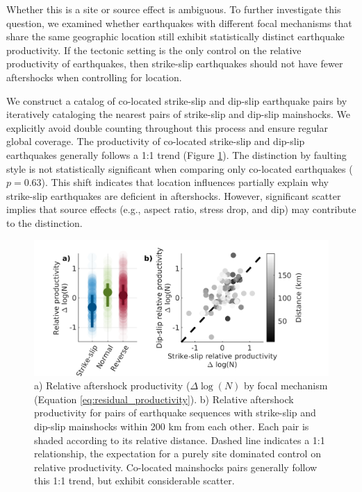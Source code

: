 \documentclass[draft]{agujournal2018}
\begin{document}
    Whether this is a site or source effect is ambiguous. To further investigate this question, we examined whether earthquakes with different focal mechanisms that share the same geographic location still exhibit statistically distinct earthquake productivity. If the tectonic setting is the only control on the relative productivity of earthquakes, then strike-slip earthquakes should not have fewer aftershocks when controlling for location. 
    
    We construct a catalog of co-located strike-slip and dip-slip earthquake pairs by iteratively cataloging the nearest pairs of strike-slip and dip-slip mainshocks. We explicitly avoid double counting throughout this process and ensure regular global coverage. The productivity of co-located strike-slip and dip-slip earthquakes generally follows a 1:1 trend (Figure \ref{fig:coloc}). The distinction by faulting style is not statistically significant when comparing only co-located earthquakes ($p = 0.63$). This shift indicates that location influences partially explain why strike-slip earthquakes are deficient in aftershocks. However, significant scatter implies that source effects (e.g., aspect ratio, stress drop, and dip) may contribute to the distinction.
    
    \begin{figure}
        \centering
        \includegraphics{figures/fmspairs.png}
        \caption{a) Relative aftershock productivity ($\Delta \log(N)$ by focal mechanism (Equation \ref{eq:residual_productivity}). b) Relative aftershock productivity for pairs of earthquake sequences with strike-slip and dip-slip mainshocks within 200 km from each other. Each pair is shaded according to its relative distance. Dashed line indicates a 1:1 relationship, the expectation for a purely site dominated control on relative productivity. Co-located mainshocks pairs generally follow this 1:1 trend, but exhibit considerable scatter.}
        \label{fig:coloc}
    \end{figure}
        
\end{document}
